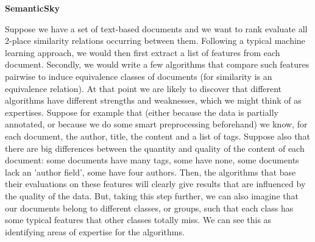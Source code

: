 \documentclass[11pt]{article}
\begin{document}
    
   





\begin{center}
\large{ \textbf{SemanticSky} }
\end{center}

Suppose we have a set of text-based documents and we want to rank evaluate all 2-place similarity relations occurring between them. Following a typical machine learning approach, we would then first extract a list of features from each document. Secondly, we would write a few algorithms that compare such features pairwise to induce equivalence classes of documents (for similarity is an equivalence relation). At that point we are likely to discover that different algorithms have different strengths and weaknesses, which we might think of as expertises. Suppose for example that (either because the data is partially annotated, or because we do some smart preprocessing beforehand) we know, for each document, the author, title, the content and a list of tags.
Suppose also that there are big differences between the quantity and quality of the content of each document: some documents have many tags, some have none, some documents lack an 'author field', some have four authors. Then, the algorithms that base their evaluations on these features will clearly give results that are influenced by the quality of the data. But, taking this step further, we can also imagine that our documents belong to different classes, or groups, such that each class has some typical features that other classes totally miss. We can see this as identifying areas of expertise for the algorithms.
\end{document}
